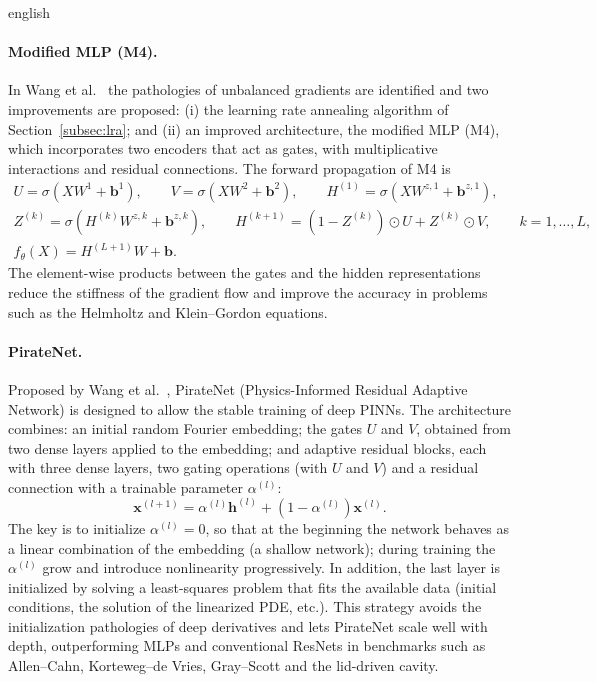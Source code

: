 \documentclass[../0000.tex]{subfiles}
\begin{document}
\begin{hyphenrules}{english}
\paragraph{Modified MLP (M4).}
In Wang et al.~\cite{wang2021gradient} the pathologies of unbalanced gradients are identified and two improvements
are proposed: (i) the learning rate annealing algorithm of Section~\ref{subsec:lra}; and (ii) an improved
architecture, the modified MLP (M4), which incorporates two encoders that act as gates, with
multiplicative interactions and residual connections. The forward propagation of M4 is
\begin{equation}
  \begin{gathered}
    U=\sigma(XW^{1}+\mathbf{b}^{1}),\qquad V=\sigma(XW^{2}+\mathbf{b}^{2}),\qquad
    H^{(1)}=\sigma(XW^{z,1}+\mathbf{b}^{z,1}),\\
    Z^{(k)}=\sigma(H^{(k)}W^{z,k}+\mathbf{b}^{z,k}),\qquad
    H^{(k+1)}=(1-Z^{(k)})\odot U+Z^{(k)}\odot V,\qquad k=1,\dots,L,\\
    f_\theta(X)=H^{(L+1)}W+\mathbf{b}.
  \end{gathered}
  \label{eq:m4}
\end{equation}
The element-wise products between the gates and the hidden representations reduce the stiffness of the
gradient flow and improve the accuracy in problems such as the Helmholtz and Klein--Gordon equations.

\paragraph{PirateNet.}
Proposed by Wang et al.~\cite{wang2024piratenets}, PirateNet (Physics-Informed Residual Adaptive Network) is
designed to allow the stable training of deep PINNs. The architecture combines: an initial random Fourier
embedding; the gates $U$ and $V$, obtained from two dense layers applied to the embedding; and adaptive
residual blocks, each with three dense layers, two gating operations (with $U$ and $V$) and a residual
connection with a trainable parameter $\alpha^{(l)}$:
\begin{equation}
  \mathbf{x}^{(l+1)}=\alpha^{(l)}\mathbf{h}^{(l)}+(1-\alpha^{(l)})\mathbf{x}^{(l)}.
  \label{eq:pirate}
\end{equation}
The key is to initialize $\alpha^{(l)}=0$, so that at the beginning the network behaves as a linear
combination of the embedding (a shallow network); during training the $\alpha^{(l)}$ grow and introduce
nonlinearity progressively. In addition, the last layer is initialized by solving a least-squares problem
that fits the available data (initial conditions, the solution of the linearized PDE, etc.). This strategy
avoids the initialization pathologies of deep derivatives and lets PirateNet scale well with depth,
outperforming MLPs and conventional ResNets in benchmarks such as Allen--Cahn, Korteweg--de Vries,
Gray--Scott and the lid-driven cavity.


\end{hyphenrules}
\end{document}

